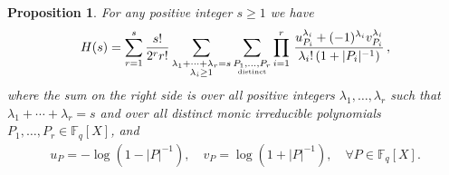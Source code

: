 \documentclass[12pt]{amsart}
\theoremstyle{plain}
\newtheorem{prop}{Proposition}
\newcommand{\F}{{\mathbb F}_q}
\begin{document}
\begin{prop} \label{6:lem0} For any positive integer $s \ge 1$ we have
\begin{eqnarray*} H(s)=\sum_{r=1}^s \frac{s!}{2^r r!}\sum_{\substack{\lambda_1+\cdots+\lambda_r=s\\ \lambda_i \ge 1}}\sum_{\substack{P_1,\ldots,P_r\\ \mbox{\tiny distinct}}} \prod_{i=1}^r\,\frac{u_{P_i}^{\lambda_i}+(-1)^{\lambda_i}
v_{P_i}^{\lambda_i}}{\lambda_i! \left(1+|P_i|^{-1}\right)} \,,\end{eqnarray*}
where the sum on the right side is over all positive integers $\lambda_1,\ldots,\lambda_r$ such that $\lambda_1+\cdots+\lambda_r=s$ and over all distinct monic irreducible polynomials $P_1,\ldots,P_r \in \F[X]$, and
\begin{eqnarray} \label{6:upvp} u_P=-\log \left(1-|P|^{-1}\right), \quad v_P=\log \left(1+|P|^{-1}\right), \quad \forall P \in \F[X]. \end{eqnarray}
\end{prop}
\end{document}
